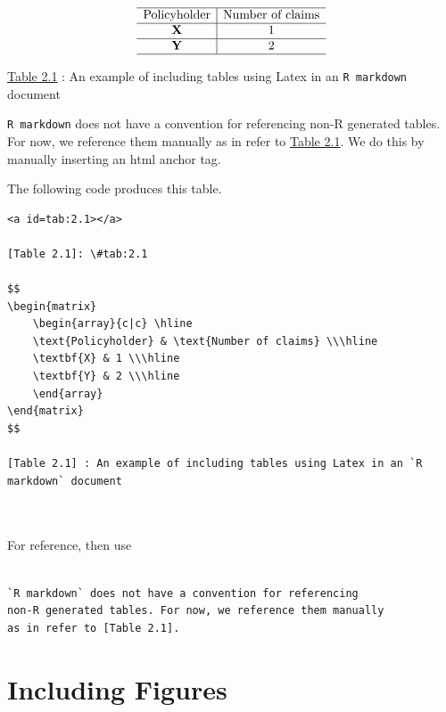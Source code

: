 \documentclass[]{book}
\theoremstyle{definition}
\theoremstyle{definition}
\theoremstyle{definition}
\theoremstyle{remark}
\begin{document}
\[
\begin{matrix}
    \begin{array}{c|c} \hline
    \text{Policyholder} & \text{Number of claims} \\\hline
    \textbf{X} & 1 \\\hline
    \textbf{Y} & 2 \\\hline
    \end{array}
\end{matrix}
\]

\protect\hyperlink{tab:2.1}{Table 2.1} : An example of including tables
using Latex in an \texttt{R\ markdown} document

\texttt{R\ markdown} does not have a convention for referencing non-R
generated tables. For now, we reference them manually as in refer to
\protect\hyperlink{tab:2.1}{Table 2.1}. We do this by manually inserting
an html anchor tag.

The following code produces this table.

\begin{verbatim}
<a id=tab:2.1></a> 

[Table 2.1]: \#tab:2.1

$$
\begin{matrix}
    \begin{array}{c|c} \hline
    \text{Policyholder} & \text{Number of claims} \\\hline
    \textbf{X} & 1 \\\hline
    \textbf{Y} & 2 \\\hline
    \end{array}
\end{matrix}
$$
    
[Table 2.1] : An example of including tables using Latex in an `R markdown` document    

    
\end{verbatim}

For reference, then use

\begin{verbatim}

`R markdown` does not have a convention for referencing 
non-R generated tables. For now, we reference them manually 
as in refer to [Table 2.1].
\end{verbatim}

\section{Including Figures}\label{including-figures}
\end{document}
